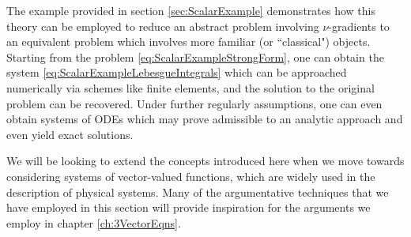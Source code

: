 The example provided in section \ref{sec:ScalarExample} demonstrates how this theory can be employed to reduce an abstract problem involving $\nu$-gradients to an equivalent problem which involves more familiar (or ``classical") objects.
Starting from the problem \eqref{eq:ScalarExampleStrongForm}, one can obtain the system \eqref{eq:ScalarExampleLebesgueIntegrals} which can be approached numerically via schemes like finite elements, and the solution to the original problem can be recovered.
Under further regularly assumptions, one can even obtain systems of ODEs which may prove admissible to an analytic approach and even yield exact solutions. \newline

We will be looking to extend the concepts introduced here when we move towards considering systems of vector-valued functions, which are widely used in the description of physical systems.
Many of the argumentative techniques that we have employed in this section will provide inspiration for the arguments we employ in chapter \ref{ch:3VectorEqns}.
